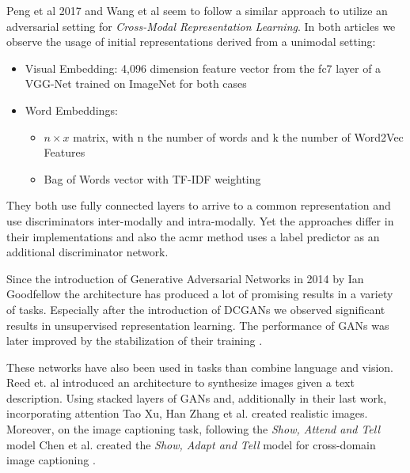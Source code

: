 \documentclass[twocolumn]{article}
\begin{document}
Peng et al 2017 \cite{DBLP:journals/corr/abs-1710-05106} and Wang et al \cite{acmr} seem to follow a similar approach to utilize an adversarial setting \cite{2014arXiv1406.2661G} for \textit{Cross-Modal Representation Learning}.
In both articles we observe the usage of initial representations derived from a unimodal setting:

\begin{itemize}
  \item{Visual Embedding:} 4,096 dimension feature vector from the fc7 layer of a VGG-Net trained on ImageNet for both cases
  \item{Word Embeddings:} 
    \begin{itemize}
      \item $n \times x$ matrix, with n the number of words and k the number of Word2Vec Features\cite{DBLP:journals/corr/MikolovSCCD13}
      \item Bag of Words vector with TF-IDF weighting
    \end{itemize}
\end{itemize}


They both use fully connected layers to arrive to a common representation and use discriminators inter-modally and intra-modally. Yet the approaches differ in their implementations and also the acmr method uses a label predictor as an additional discriminator network.


Since the introduction of Generative Adversarial Networks in 2014 by Ian Goodfellow\cite{2014arXiv1406.2661G} the architecture has produced a lot of promising results in a variety of tasks. Especially after the introduction of DCGANs we observed significant results in unsupervised representation learning\cite{DBLP:journals/corr/RadfordMC15}. The performance of GANs was later improved by the stabilization of their training \cite{DBLP:journals/corr/RothLNH17, Arjovsky2017Jan}. 

These networks have also been used in tasks than combine language and vision. Reed et. al\cite{reed2016generative} introduced an architecture to synthesize images given a text description. Using stacked layers of GANs and, additionally in their last work, incorporating attention Tao Xu, Han Zhang et al.\cite{han2017stackgan,DBLP:journals/corr/abs-1710-10916,DBLP:journals/corr/abs-1711-10485} created realistic images. Moreover, on the image captioning task, following the \textit{Show, Attend and Tell} model \cite{DBLP:journals/corr/XuBKCCSZB15} Chen et al. created the \textit{Show, Adapt and Tell} model for cross-domain image captioning \cite{chen2017show}.
\end{document}
